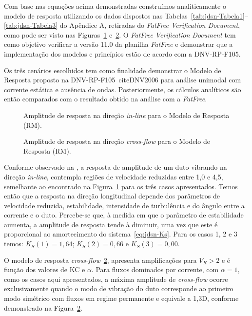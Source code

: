 Com base nas equações acima demonstradas construímos analiticamente o modelo de resposta utilizando os dados dispostos nas Tabelas~\ref{tab:jdsn-Tabela1}--\ref{tab:jdsn-Tabela3} do Apêndice A, retiradas do \textit{FatFree Verification Document}, como pode ser visto nas Figuras~\ref{fig:jdsn-Resposta_IL} e~\ref{fig:jdsn-Resposta_CF}.
O \textit{FatFree Verification Document} tem como objetivo verificar a versão 11.0 da planilha \textit{FatFree} e demonstrar que a implementação dos modelos e princípios estão de acordo com a DNV-RP-F105.

Os três cenários escolhidos tem como finalidade demonstrar o Modelo de Resposta proposto na DNV-RP-F105~cite{DNV2006} para análise unimodal com corrente estática e ausência de ondas.
Posteriormente, os cálculos analíticos são então comparados com o resultado obtido na análise com a \textit{FatFree}.


\begin{figure}[ht!]
\begin{center}
\caption{Amplitude de resposta na direção \textit{in-line} para o Modelo de Resposta (RM).}
\label{fig:jdsn-Resposta_IL}
\end{center}
\end{figure}

\begin{figure}[ht!]
\begin{center}
\caption{Amplitude de resposta na direção \textit{cross-flow} para o Modelo de Resposta (RM).}
\label{fig:jdsn-Resposta_CF}
\end{center}
\end{figure}

Conforme observado na , a resposta de amplitude de um duto vibrando na direção \textit{in-line}, contempla regiões de velocidade reduzidas entre 1,0 e 4,5, semelhante ao encontrado na Figura~\ref{fig:jdsn-Resposta_IL} para os três casos apresentados.
Temos então que a resposta na direção longitudinal depende dos parâmetros de velocidade reduzida, estabilidade, intensidade de turbulência e do ângulo entre a corrente e o duto.
Percebe-se que, à medida em que o parâmetro de estabilidade aumenta, a amplitude de resposta tende à diminuir, uma vez que este é proporcional ao amortecimento do sistema~\ref{eq:jdsn-Ks}.
Para os casos 1, 2 e 3 temos: $K_S(1) = 1,64$; $K_S(2) = 0,66$ e $K_S(3) = 0,00$.

O modelo de resposta \textit{cross-flow}~\ref{fig:jdsn-Resposta_CF}, apresenta amplificações para $V_R > 2$ e é função dos valores de KC e $\alpha$.
Para fluxos dominados por corrente, com $\alpha = 1$, como os casos aqui apresentados, a máxima amplitude de \textit{cross-flow} ocorre exclusivamente quando o modo de vibração do duto corresponde ao primeiro modo simétrico com fluxos em regime permanente e equivale a 1,3D, conforme demonstrado na Figura~\ref{fig:jdsn-Resposta_CF}.

